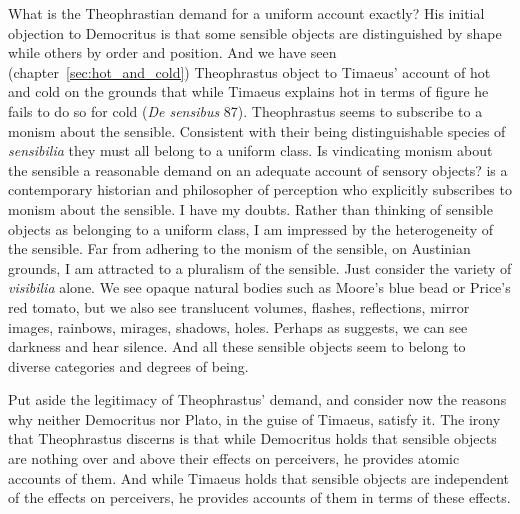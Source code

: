 What is the Theophrastian demand for a uniform account exactly? His initial objection to Democritus is that some sensible objects are distinguished by shape while others by order and position. And we have seen (chapter~\ref{sec:hot_and_cold}) Theophrastus object to Timaeus' account of hot and cold on the grounds that while Timaeus explains hot in terms of figure he fails to do so for cold (\emph{De sensibus} 87). Theophrastus seems to subscribe to a monism about the sensible. Consistent with their being distinguishable species of \emph{sensibilia} they must all belong to a uniform class. Is vindicating monism about the sensible a reasonable demand on an adequate account of sensory objects? \citet{Pasnau:1999ss,Pasnau:2000aa} is a contemporary historian and philosopher of perception who explicitly subscribes to monism about the sensible. I have my doubts. Rather than thinking of sensible objects as belonging to a uniform class, I am impressed by the heterogeneity of the sensible. Far from adhering to the monism of the sensible, on Austinian grounds, I am attracted to a pluralism of the sensible. Just consider the variety of \emph{visibilia} alone. We see opaque natural bodies such as Moore's \citeyearpar{Moore:1903uo} blue bead or Price's \citeyearpar{Price:1932fk} red tomato, but we also see translucent volumes, flashes, reflections, mirror images, rainbows, mirages, shadows, holes. Perhaps as \citet{Sorensen:2004jk,Sorensen:2008kx,Sorensen:2009aa} suggests, we can see darkness and hear silence. And all these sensible objects seem to belong to diverse categories and degrees of being. 

Put aside the legitimacy of Theophrastus' demand, and consider now the reasons why neither Democritus nor Plato, in the guise of Timaeus, satisfy it. The irony that Theophrastus discerns is that while Democritus holds that sensible objects are nothing over and above their effects on perceivers, he provides atomic accounts of them. And while Timaeus holds that sensible objects are independent of the effects on perceivers, he provides accounts of them in terms of these effects.

